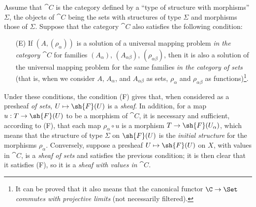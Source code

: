 \begin{env}[3.1.3]
\label{0.3.1.3}
Assume that $\cat{C}$ is the category defined by a
``type of structure with morphisms'' $\Sigma$, the objects of $\cat{C}$ being the
sets with structures of type $\Sigma$ and morphisms those of $\Sigma$. Suppose
that the category $\cat{C}$ also satisfies the following condition:
\begin{enumerate}
  \item[(E)] If $(A,(\rho_\alpha))$ is a solution of a universal mapping problem \emph{in the category $\cat{C}$} for families $(A_\alpha)$, $(A_{\alpha\beta})$,
    $(\rho_{\alpha\beta})$, then it is also a solution of the universal mapping
    problem for the same families \emph{in the category of sets} (that is, when
    we consider $A$, $A_\alpha$, and $A_{\alpha\beta}$ as sets, $\rho_\alpha$
    and $\rho_{\alpha\beta}$ as functions)\footnote{It can be proved that it
    also means that the canonical functor $\C\to\Set$ \emph{commutes with
    projective limits} (not necessarily filtered).}.
\end{enumerate}

Under these conditions, the condition (F) gives that, when considered as a
presheaf \emph{of sets}, $U\mapsto\sh{F}(U)$ is a \emph{sheaf}. In addition, for
a map $u:T\to\sh{F}(U)$ to be a morphism of $\cat{C}$, it is necessary and
sufficient, according to (F), that each map $\rho_\alpha\circ u$ is a morphism
$T\to\sh{F}(U_\alpha)$, which means that the structure of type $\Sigma$ on
$\sh{F}(U)$ is the \emph{initial structure} for the morphisms $\rho_\alpha$.
Conversely, suppose a presheaf $U\mapsto\sh{F}(U)$ on $X$, with values in $\cat{C}$,
is a \emph{sheaf of sets} and satisfies the previous condition; it is then clear
that it satisfies (F), so it is a \emph{sheaf with values in $\cat{C}$}.
\end{env}

